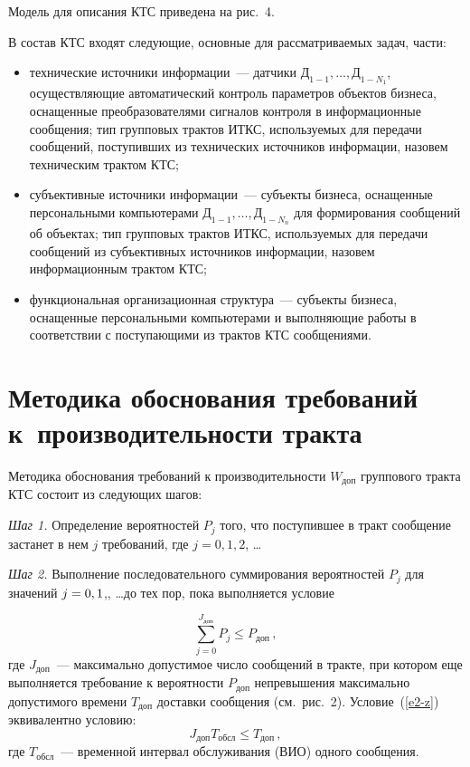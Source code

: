 \begin{multicols}{2}
     Модель для описания КТС приведена на рис.~4.


     В состав КТС входят следующие, основные для рассматриваемых задач, части:
     \begin{itemize}
\item технические источники информации~--- датчики $\mathrm{Д}_{1-1}, \ldots , 
\mathrm{Д}_{1-N_1}$, осуществляющие автоматический контроль параметров объектов 
бизнеса, оснащенные преобразователями сигналов контроля в информационные 
сообщения; тип групповых трактов ИТКС, используемых для передачи сообщений, 
поступивших из технических источников информации, назовем техническим трактом 
КТС;
\item субъективные источники информации~--- субъекты бизнеса, оснащенные 
персональными компьютерами $\mathrm{Д}_{1-1}, \ldots , \mathrm{Д}_{1-N_n}$ для 
формирования сообщений об объектах; тип групповых трактов ИТКС, используемых для 
передачи сообщений из субъективных источников информации, назовем 
информационным трактом КТС;
\item функциональная организационная структура~--- субъекты бизнеса, оснащенные 
персональными компьютерами и выполняющие работы в соответствии с поступающими 
из трактов КТС сообщениями. 
\end{itemize}

\section{Методика обоснования требований к~производительности тракта}

     Методика обоснования требований к производительности $W_{\mathrm{доп}}$ 
группового тракта КТС состоит из следующих шагов:
     
\textit{Шаг 1.} Определение вероятностей $P_j$ того, что поступившее в тракт сообщение 
застанет в нем $j$ требований, где $j = 0, 1, 2$, \ldots

\textit{Шаг 2.} Выполнение последовательного суммирования вероятностей $P_j$ для 
значений $j \hm= 0, 1$,, \ldots до тех пор, пока выполняется условие

\noindent
\begin{equation}
\sum\limits_{j=0}^{J_{\mathrm{доп}}} P_j\leq P_{\mathrm{доп}}\,,
\label{e2-z}
\end{equation}
где $J_{\mathrm{доп}}$~--- максимально допустимое число сообщений в тракте, при котором 
еще выполняется требование к вероятности $P_{\mathrm{доп}}$ непревышения 
максимально допустимого времени $T_{\mathrm{доп}}$ доставки сообщения (см.\ рис.~2). 
Условие~(\ref{e2-z}) эквивалентно условию:
\begin{equation*}
J_{\mathrm{доп}} T_{\mathrm{обсл}}\leq T_{\mathrm{доп}}\,,
\end{equation*}
где $T_{\mathrm{обсл}}$~--- временной интервал обслуживания (ВИО) одного сообщения.


\end{multicols}
